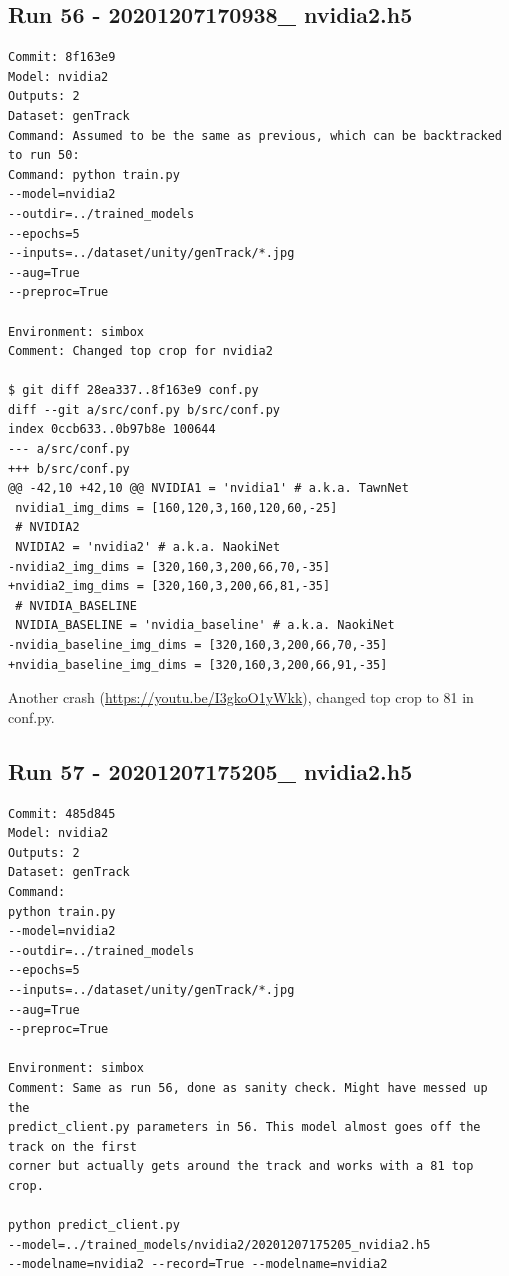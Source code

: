 \subsection{Run 56 - 20201207170938\_ nvidia2.h5}
\label{app_res:56}
\begin{verbatim}
Commit: 8f163e9
Model: nvidia2
Outputs: 2
Dataset: genTrack
Command: Assumed to be the same as previous, which can be backtracked to run 50:
Command: python train.py
--model=nvidia2
--outdir=../trained_models
--epochs=5
--inputs=../dataset/unity/genTrack/*.jpg
--aug=True
--preproc=True

Environment: simbox
Comment: Changed top crop for nvidia2

$ git diff 28ea337..8f163e9 conf.py
diff --git a/src/conf.py b/src/conf.py
index 0ccb633..0b97b8e 100644
--- a/src/conf.py
+++ b/src/conf.py
@@ -42,10 +42,10 @@ NVIDIA1 = 'nvidia1' # a.k.a. TawnNet
 nvidia1_img_dims = [160,120,3,160,120,60,-25]
 # NVIDIA2
 NVIDIA2 = 'nvidia2' # a.k.a. NaokiNet
-nvidia2_img_dims = [320,160,3,200,66,70,-35]
+nvidia2_img_dims = [320,160,3,200,66,81,-35]
 # NVIDIA_BASELINE
 NVIDIA_BASELINE = 'nvidia_baseline' # a.k.a. NaokiNet
-nvidia_baseline_img_dims = [320,160,3,200,66,70,-35]
+nvidia_baseline_img_dims = [320,160,3,200,66,91,-35]

\end{verbatim}

Another crash (\url{https://youtu.be/I3gkoO1yWkk}), changed top crop to 81 in conf.py.

\subsection{Run 57 - 20201207175205\_ nvidia2.h5}
\label{app_res:57}
\begin{verbatim}
Commit: 485d845
Model: nvidia2
Outputs: 2
Dataset: genTrack
Command:
python train.py
--model=nvidia2
--outdir=../trained_models
--epochs=5
--inputs=../dataset/unity/genTrack/*.jpg
--aug=True
--preproc=True

Environment: simbox
Comment: Same as run 56, done as sanity check. Might have messed up the 
predict_client.py parameters in 56. This model almost goes off the track on the first
corner but actually gets around the track and works with a 81 top crop.

python predict_client.py 
--model=../trained_models/nvidia2/20201207175205_nvidia2.h5 
--modelname=nvidia2 --record=True --modelname=nvidia2
\end{verbatim}

